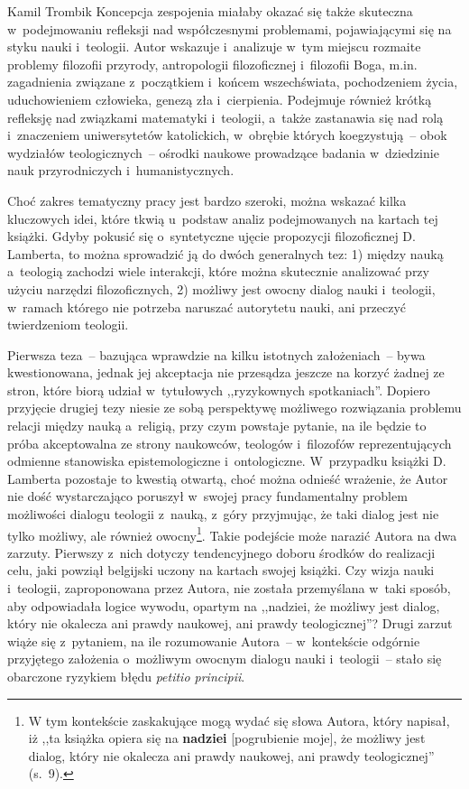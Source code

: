 \begin{recplenv}{Kamil Trombik}
Koncepcja zespojenia miałaby okazać się także skuteczna w~podejmowaniu refleksji nad współczesnymi problemami,
pojawiającymi się na styku nauki i~teologii. Autor wskazuje i~analizuje w~tym miejscu rozmaite problemy filozofii
przyrody, antropologii filozoficznej i~filozofii Boga, m.in. zagadnienia związane z~początkiem i~końcem wszechświata,
pochodzeniem życia, uduchowieniem człowieka, genezą zła i~cierpienia. Podejmuje również krótką refleksję nad związkami
matematyki i~teologii, a~także zastanawia się nad rolą i~znaczeniem uniwersytetów katolickich, w~obrębie których
koegzystują~-- obok wydziałów teologicznych~-- ośrodki naukowe prowadzące badania w~dziedzinie nauk
przyrodniczych i~humanistycznych.

Choć zakres tematyczny pracy jest bardzo szeroki, można wskazać kilka kluczowych idei, które tkwią u~podstaw analiz
podejmowanych na kartach tej książki. Gdyby pokusić się o~syntetyczne ujęcie propozycji filozoficznej D. Lamberta, to
można sprowadzić ją do dwóch generalnych tez: 1) między nauką a~teologią zachodzi wiele interakcji, które można
skutecznie analizować przy użyciu narzędzi filozoficznych, 2) możliwy jest owocny dialog nauki i~teologii, w~ramach
którego nie potrzeba naruszać autorytetu nauki, ani przeczyć twierdzeniom teologii.

\enlargethispage{-.5\baselineskip}

Pierwsza teza~-- bazująca wprawdzie na kilku istotnych założeniach~-- bywa kwestionowana, jednak jej akceptacja nie
przesądza jeszcze na korzyć żadnej ze stron, które biorą udział w~tytułowych ,,ryzykownych spotkaniach''. Dopiero
przyjęcie drugiej tezy niesie ze sobą perspektywę możliwego rozwiązania problemu relacji między nauką a~religią, przy
czym powstaje pytanie, na ile będzie to próba akceptowalna ze strony naukowców, teologów i~filozofów reprezentujących
odmienne stanowiska epistemologiczne i~ontologiczne. W~przypadku książki D. Lamberta pozostaje to kwestią otwartą, choć
można odnieść wrażenie, że Autor nie dość wystarczająco poruszył w~swojej pracy fundamentalny problem możliwości
dialogu teologii z~nauką, z~góry przyjmując, że taki dialog jest nie tylko możliwy, ale również owocny\footnote{W tym
kontekście zaskakujące mogą wydać się słowa Autora, który napisał, iż ,,ta książka opiera się na \textbf{nadziei}
[pogrubienie moje], że możliwy jest dialog, który nie okalecza ani prawdy naukowej, ani prawdy teologicznej'' (s.~9).}.
Takie podejście może narazić Autora na dwa zarzuty. Pierwszy z~nich dotyczy tendencyjnego doboru środków do realizacji
celu, jaki powziął belgijski uczony na kartach swojej książki. Czy wizja nauki i~teologii, zaproponowana przez Autora,
nie została przemyślana w~taki sposób, aby odpowiadała logice wywodu, opartym na ,,nadziei, że możliwy jest dialog,
który nie okalecza ani prawdy naukowej, ani prawdy teologicznej''? Drugi zarzut wiąże się z~pytaniem, na ile rozumowanie
Autora~-- w~kontekście odgórnie przyjętego założenia o~możliwym owocnym dialogu nauki i~teologii~-- stało się obarczone
ryzykiem błędu \textit{petitio principii}.


\end{recplenv}
